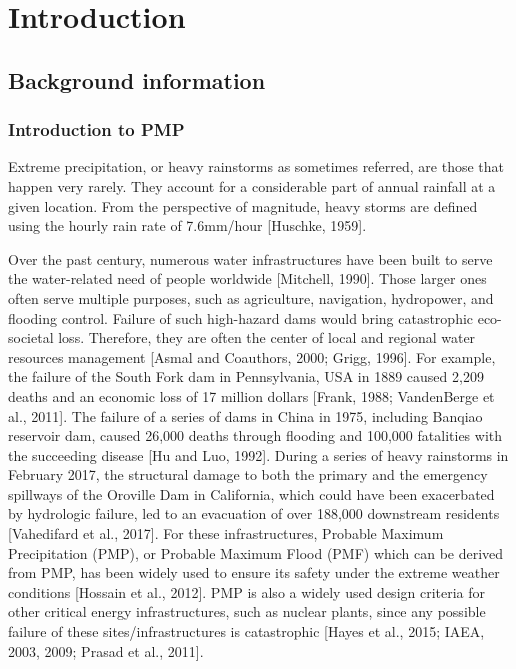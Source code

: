 \chapter {Introduction}
\label{ch:intro}

\section {Background information}

\subsection{Introduction to PMP}

Extreme precipitation, or heavy rainstorms as sometimes referred, are those that happen very rarely. They account for a considerable part of annual rainfall at a given location. From the perspective of magnitude, heavy storms are defined using the hourly rain rate of 7.6mm/hour [Huschke, 1959].

Over the past century, numerous water infrastructures have been built to serve the water-related need of people worldwide [Mitchell, 1990]. Those larger ones often serve multiple purposes, such as agriculture, navigation, hydropower, and flooding control. Failure of such high-hazard dams would bring catastrophic eco-societal loss. Therefore, they are often the center of local and regional water resources management [Asmal and Coauthors, 2000; Grigg, 1996]. For example, the failure of the South Fork dam in Pennsylvania, USA in 1889 caused 2,209 deaths and an economic loss of 17 million dollars [Frank, 1988; VandenBerge et al., 2011].  The failure of a series of dams in China in 1975, including Banqiao reservoir dam, caused 26,000 deaths through flooding and 100,000 fatalities with the succeeding disease [Hu and Luo, 1992]. During a series of heavy rainstorms in February 2017, the structural damage to both the primary and the emergency spillways of the Oroville Dam in California, which could have been exacerbated by hydrologic failure, led to an evacuation of over 188,000 downstream residents [Vahedifard et al., 2017]. For these infrastructures, Probable Maximum Precipitation (PMP), or Probable Maximum Flood (PMF) which can be derived from PMP,  has been widely used to ensure its safety under the extreme weather conditions [Hossain et al., 2012]. PMP is also a widely used design criteria for other critical energy infrastructures, such as nuclear plants, since any possible failure of these sites/infrastructures is catastrophic [Hayes et al., 2015; IAEA, 2003, 2009; Prasad et al., 2011].

